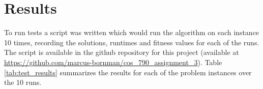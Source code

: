\section{Results}
To run tests a script was written which would run the algorithm on each instance 10 times, recording the solutions, runtimes and fitness values for each of the runs. The script is available in the github repository for this project (available at \url{https://github.com/marcus-bornman/cos_790_assignment_3}). Table \ref{tab:test_results} summarizes the results for each of the problem instances over the 10 runs.

\begin{table}[H]
\caption{Test Results}
\label{tab:test_results}
\end{table}